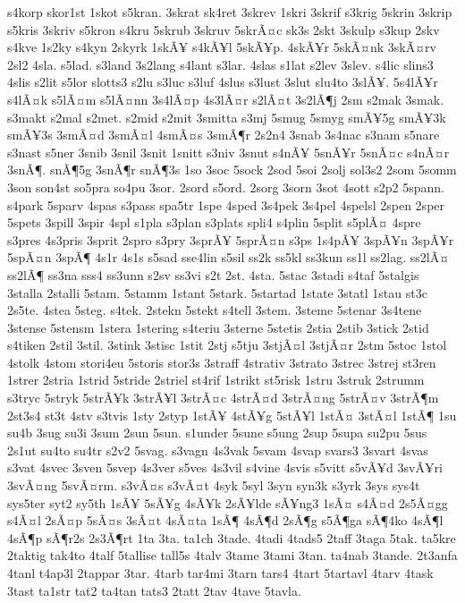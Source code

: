 {s4korp
skor1st
1skot
s5kran.
3skrat
sk4ret
3skrev
1skri
3skrif
s3krig
5skrin
3skrip
s5kris
3skriv
s5kron
s4kru
5skrub
3skruv
5skrÃ¤c
sk3s
2skt
3skulp
s3kup
2skv
s4kve
1s2ky
s4kyn
2skyrk
1skÃ¥
s4kÃ¥l
5skÃ¥p.
4skÃ¥r
5skÃ¤nk
3skÃ¤rv
2sl2
4sla.
s5lad.
s3land
3s2lang
s4lant
s3lar.
4slas
s1lat
s2lev
3slev.
s4lic
slins3
4slis
s2lit
s5lor
slotts3
s2lu
s3luc
s3luf
4slus
s3lust
3slut
slu4to
3slÃ¥.
5s4lÃ¥r
s4lÃ¤k
s5lÃ¤m
s5lÃ¤nn
3s4lÃ¤p
4s3lÃ¤r
s2lÃ¤t
3s2lÃ¶j
2sm
s2mak
3smak.
s3makt
s2mal
s2met.
s2mid
s2mit
3smitta
s3mj
5smug
5smyg
smÃ¥5g
smÃ¥3k
smÃ¥3s
3smÃ¤d
3smÃ¤l
4smÃ¤s
3smÃ¶r
2s2n4
3snab
3s4nac
s3nam
s5nare
s3nast
s5ner
3snib
3snil
3snit
1snitt
s3niv
3snut
s4nÃ¥
5snÃ¥r
5snÃ¤c
s4nÃ¤r
3snÃ¶.
snÃ¶5g
3snÃ¶r
snÃ¶3s
1so
3soc
5sock
2sod
5soi
2solj
sol3s2
2som
5somm
3son
son4st
so5pra
so4pu
3sor.
2sord
s5ord.
2sorg
3sorn
3sot
4sott
s2p2
5spann.
s4park
5sparv
4spas
s3pass
spa5tr
1spe
4sped
3s4pek
3s4pel
4spelsl
2spen
2sper
5spets
3spill
3spir
4spl
s1pla
s3plan
s3plats
spli4
s4plin
5split
s5plÃ¤
4spre
s3pres
4s3pris
3sprit
2spro
s3pry
3sprÃ¥
5sprÃ¤n
s3ps
1s4pÃ¥
3spÃ¥n
3spÃ¥r
5spÃ¤n
3spÃ¶
4s1r
4s1s
s5sad
sse4lin
s5sil
ss2k
ss5kl
ss3kun
ss1l
ss2lag.
ss2lÃ¤
ss2lÃ¶
ss3na
sss4
ss3unn
s2sv
ss3vi
s2t
2st.
4sta.
5stac
3stadi
s4taf
5stalgis
3stalla
2stalli
5stam.
5stamm
1stant
5stark.
5startad
1state
3statl
1stau
st3c
2s5te.
4stea
5steg.
s4tek.
2stekn
5stekt
s4tell
3stem.
3steme
5stenar
3s4tene
3stense
5stensm
1stera
1stering
s4teriu
3sterne
5stetis
2stia
2stib
3stick
2stid
s4tiken
2stil
3stil.
3stink
3stisc
1stit
2stj
s5tju
3stjÃ¤l
3stjÃ¤r
2stm
5stoc
1stol
4stolk
4stom
stori4eu
5storis
stor3s
3straff
4strativ
3strato
3strec
3strej
st3ren
1strer
2stria
1strid
5stride
2striel
st4rif
1strikt
st5risk
1stru
3struk
2strumm
s3tryc
5stryk
5strÃ¥k
3strÃ¥l
3strÃ¤c
4strÃ¤d
3strÃ¤ng
5strÃ¤v
3strÃ¶m
2st3s4
st3t
4stv
s3tvis
1sty
2styp
1stÃ¥
4stÃ¥g
5stÃ¥l
1stÃ¤
3stÃ¤l
1stÃ¶
1su
su4b
3sug
su3i
3sum
2sun
5sun.
s1under
5sune
s5ung
2sup
5supa
su2pu
5sus
2s1ut
su4to
su4tr
s2v2
5svag.
s3vagn
4s3vak
5svam
4svap
svars3
3svart
4svas
s3vat
4svec
3sven
5svep
4s3ver
s5ves
4s3vil
s4vine
4svis
s5vitt
s5vÃ¥d
3svÃ¥ri
3svÃ¤ng
5svÃ¤rm.
s3vÃ¤s
s3vÃ¤t
4syk
5syl
3syn
syn3k
s3yrk
3sys
sys4t
sys5ter
syt2
sy5th
1sÃ¥
5sÃ¥g
4sÃ¥k
2sÃ¥lde
sÃ¥ng3
1sÃ¤
s4Ã¤d
2s5Ã¤gg
s4Ã¤l
2sÃ¤p
5sÃ¤s
3sÃ¤t
4sÃ¤ta
1sÃ¶
4sÃ¶d
2sÃ¶g
s5Ã¶ga
sÃ¶4ko
4sÃ¶l
4sÃ¶p
sÃ¶r2s
2s3Ã¶rt
1ta
3ta.
ta1ch
3tade.
4tadi
4tads5
2taff
3taga
5tak.
ta5kre
2taktig
tak4to
4talf
5tallise
tall5s
4talv
3tame
3tami
3tan.
ta4nab
3tande.
2t3anfa
4tanl
t4ap3l
2tappar
3tar.
4tarb
tar4mi
3tarn
tars4
4tart
5tartavl
4tarv
4task
3tast
ta1str
tat2
ta4tan
tats3
2tatt
2tav
4tave
5tavla.
}
